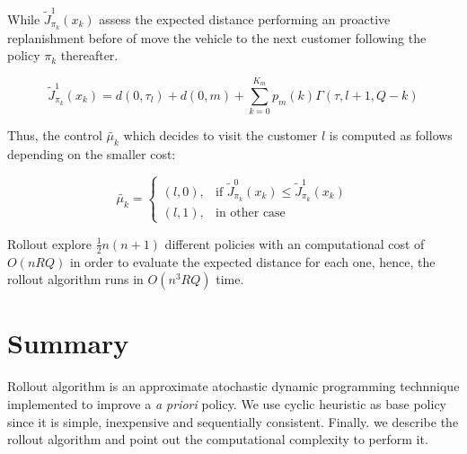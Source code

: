 While $\tilde{J}^1_{\pi_k}(x_k)$ assess the expected distance performing an proactive replanishment before of move the vehicle to the next customer following the policy ${\pi_k}$ thereafter.

\begin{equation}\label{ra:Cost2Go1}%
 \tilde{J}^1_{\pi_k}(x_k)=d(0,\tau_l)+d(0,m)+\sum_{k=0}^{K_m}p_m(k)\Gamma(\tau,l+1,Q-k)
\end{equation}

Thus, the control $\tilde{\mu_k}$ which decides to visit the customer $l$ is computed as follows depending on the smaller cost:

\begin{equation}\label{eq:costg}
    \tilde{\mu_k} = \left \{ \begin{array}{ll}
    (l,0), & \text{if } \tilde{J}^0_{\pi_k}(x_k) \leq \tilde{J}^1_{\pi_k}(x_k)\\
    (l,1), & \text{in other case}
    \end{array} \right.
 \end{equation}



Rollout explore $\frac{1}{2}n(n+1)$ different policies with an computational cost of $O(nRQ)$ in order to evaluate the expected distance for each one, hence, the rollout algorithm runs in $O(n^3RQ)$ time.

\section{Summary}

Rollout algorithm is an approximate atochastic dynamic programming technnique implemented to improve a \textit{a priori} policy. We use cyclic heuristic as base policy since it is simple, inexpensive and sequentially consistent. Finally. we describe the rollout algorithm and point out the computational complexity to perform it.





